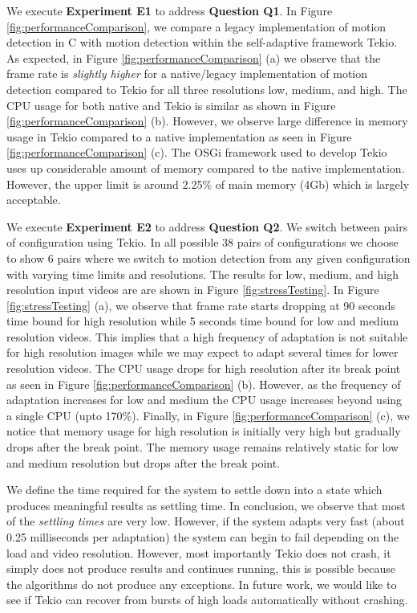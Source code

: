 We execute  \textbf{Experiment E1} to address \textbf{Question Q1}. In Figure \ref{fig:performanceComparison}, we compare a legacy  implementation of motion detection in C with motion detection within the self-adaptive framework Tekio. As expected, in Figure \ref{fig:performanceComparison} (a) we observe that the frame rate is \emph{slightly higher} for a native/legacy implementation of motion detection compared to Tekio for all three resolutions low, medium, and high. The CPU usage for both native and Tekio is similar as shown in Figure \ref{fig:performanceComparison} (b). However, we observe large difference in memory usage in Tekio compared to a native implementation as seen in Figure \ref{fig:performanceComparison} (c). The OSGi framework used to develop Tekio uses up considerable amount of memory compared to the native implementation. However, the upper limit is around 2.25\% of main memory (4Gb) which is largely acceptable. 

We execute \textbf{Experiment E2} to address \textbf{Question Q2}. We switch between pairs of configuration using Tekio. In all possible 38 pairs of configurations we choose to show 6 pairs where we switch to motion detection from any given configuration with varying time limits and resolutions. The results for low, medium, and high resolution input videos are are shown in Figure \ref{fig:stressTesting}. In  Figure \ref{fig:stressTesting} (a), we observe that frame rate starts dropping at 90 seconds time bound for high resolution while 5 seconds time bound for low and medium resolution videos. This implies that a high frequency of adaptation is not suitable for high resolution images while we may expect to adapt several times for lower resolution videos. The CPU usage drops for high resolution after its break point as seen in Figure \ref{fig:performanceComparison} (b). However, as the frequency of adaptation increases for low and medium the CPU usage increases beyond using a single CPU (upto 170\%). Finally,  in Figure \ref{fig:performanceComparison} (c), we notice that memory usage for high resolution is initially very high but gradually drops after the break point. The memory usage remains relatively static for low and medium resolution but drops after the break point. 

We define the time required for the system to settle down into a state which produces meaningful results as settling time. In conclusion, we observe that most of the \emph{settling times} are very low. However,  if the system adapts very fast (about 0.25 milliseconds per adaptation) the system can begin to fail depending on the load and video resolution. However, most importantly Tekio does not crash, it simply does not produce results and continues running, this is possible because the algorithms do not produce any exceptions. In future work, we would like to see if Tekio can recover from bursts of high loads automatically without crashing.
